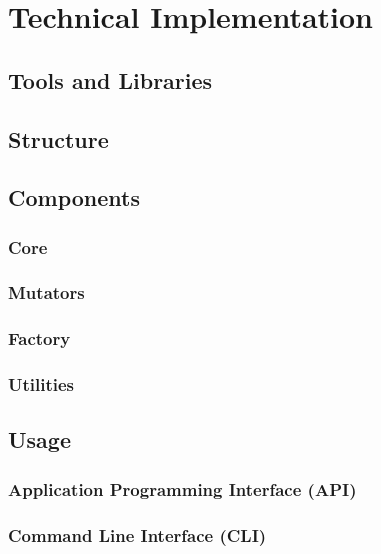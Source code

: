 
\chapter{Technical Implementation}
\label{cha:technical_implementation}

\section{Tools and Libraries}
\label{sec:tools_libraries}

\section{Structure}
\label{sec:structure}

\section{Components}
\label{sec:components}

\subsection{Core}
\label{sec:core}

\subsection{Mutators}
\label{sec:mutators}

\subsection{Factory}
\label{sec:factory}

\subsection{Utilities}
\label{sec:utilities}

\section{Usage}
\label{sec:usage}

\subsection{Application Programming Interface (API)}
\label{sec:usage_api}

\subsection{Command Line Interface (CLI)}
\label{sec:usage_cli}